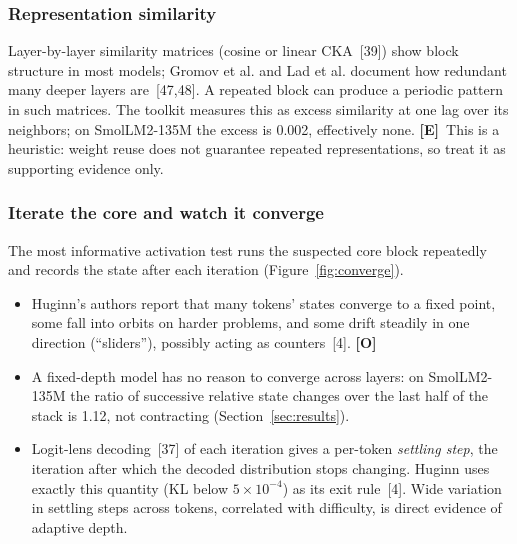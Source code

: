 \documentclass[11pt,letterpaper]{article}
\newcommand{\mO}{\textcolor{sensorteal}{\textbf{[O]}}}
\newcommand{\mE}{\textcolor{deepindigo}{\textbf{[E]}}}
\begin{document}
\subsubsection{Representation similarity}
\label{sec:similarity}

Layer-by-layer similarity matrices (cosine or linear CKA~[39]) show block structure in most models; Gromov et al. and Lad et al. document how redundant many deeper layers are~[47,48]. A repeated block can produce a periodic pattern in such matrices. The toolkit measures this as excess similarity at one lag over its neighbors; on SmolLM2-135M the excess is 0.002, effectively none. \mE\ This is a heuristic: weight reuse does not guarantee repeated representations, so treat it as supporting evidence only.

\subsubsection{Iterate the core and watch it converge}
\label{sec:converge}

The most informative activation test runs the suspected core block repeatedly and records the state after each iteration (Figure~\ref{fig:converge}).
\begin{itemize}
  \item Huginn's authors report that many tokens' states converge to a fixed point, some fall into orbits on harder problems, and some drift steadily in one direction (``sliders''), possibly acting as counters~[4]. \mO
  \item A fixed-depth model has no reason to converge across layers: on SmolLM2-135M the ratio of successive relative state changes over the last half of the stack is 1.12, not contracting (Section~\ref{sec:results}).
  \item Logit-lens decoding~[37] of each iteration gives a per-token \emph{settling step}, the iteration after which the decoded distribution stops changing. Huginn uses exactly this quantity (KL below $5\times10^{-4}$) as its exit rule~[4]. Wide variation in settling steps across tokens, correlated with difficulty, is direct evidence of adaptive depth.
\end{itemize}
\end{document}
